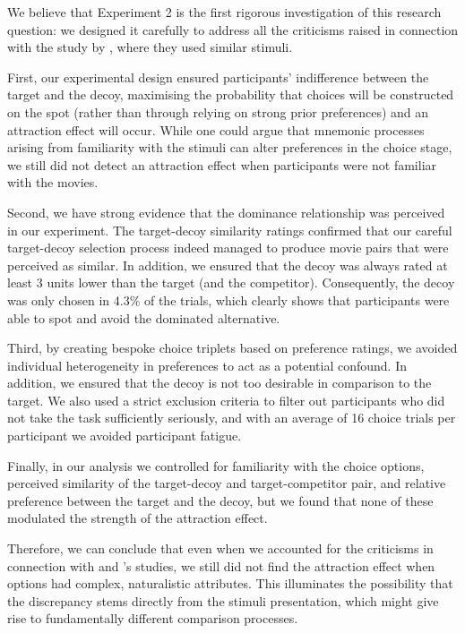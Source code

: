 \documentclass[11pt,a4paper]{article}
\begin{document}
We believe that Experiment 2 is the first rigorous investigation of this research question: we designed it carefully to address all the criticisms raised in connection with the study by \citeauthor{Frederick2014}, where they used similar stimuli.

First, our experimental design ensured participants' indifference between the target and the decoy, maximising the probability that choices will be constructed on the spot (rather than through relying on strong prior preferences) and an attraction effect will occur. While one could argue that mnemonic processes arising from familiarity with the stimuli can alter preferences in the choice stage, we still did not detect an attraction effect when participants were not familiar with the movies. 

Second, we have strong evidence that the dominance relationship was perceived in our experiment. The target-decoy similarity ratings confirmed that our careful target-decoy selection process indeed managed to produce movie pairs that were perceived as similar. In addition, we ensured that the decoy was always rated at least 3 units lower than the target (and the competitor). Consequently, the decoy was only chosen in 4.3\% of the trials, which clearly shows that participants were able to spot and avoid the dominated alternative.

Third, by creating bespoke choice triplets based on preference ratings, we avoided individual heterogeneity in preferences to act as a potential confound. In addition, we ensured that the decoy is not too desirable in comparison to the target. We also used a strict exclusion criteria to filter out participants who did not take the task sufficiently seriously, and with an average of 16 choice trials per participant we avoided participant fatigue.


Finally, in our analysis we controlled for familiarity with the choice options, perceived similarity of the target-decoy and target-competitor pair, and relative preference between the target and the decoy, but we found that none of these modulated the strength of the attraction effect.

Therefore, we can conclude that even when we accounted for the criticisms in connection with \citeauthor{Frederick2014} and \citeauthor{Yang2014}'s studies, we still did not find the attraction effect when options had complex, naturalistic attributes. This illuminates the possibility that the discrepancy stems directly from the stimuli presentation, which might give rise to fundamentally different comparison processes.
\end{document}
